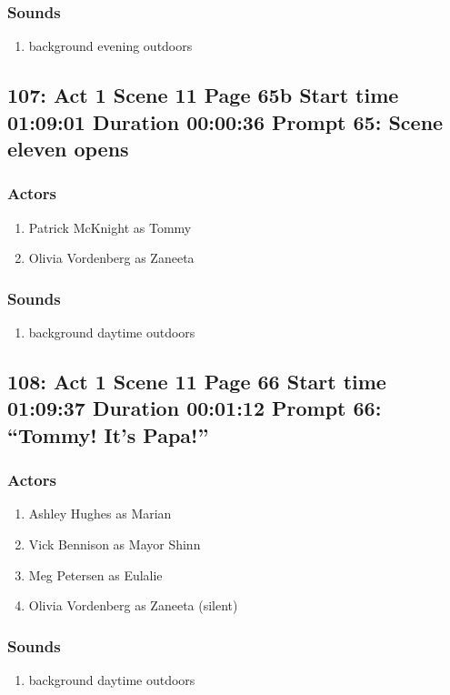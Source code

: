 \subsubsection{Sounds}
\begin{enumerate}
\item background evening outdoors
\end{enumerate}
\subsection{107: Act 1 Scene 11 Page 65b Start time 01:09:01 Duration 00:00:36 Prompt 65: Scene eleven opens}

\subsubsection{Actors}
\begin{enumerate}
\item Patrick McKnight as Tommy
\item Olivia Vordenberg as Zaneeta
\end{enumerate}

\subsubsection{Sounds}
\begin{enumerate}
\item background daytime outdoors
\end{enumerate}
\subsection{108: Act 1 Scene 11 Page 66 Start time 01:09:37 Duration 00:01:12 Prompt 66: ``Tommy!  It's Papa!''}

\subsubsection{Actors}
\begin{enumerate}
\item Ashley Hughes as Marian
\item Vick Bennison as Mayor Shinn
\item Meg Petersen as Eulalie
\item Olivia Vordenberg as Zaneeta (silent)
\end{enumerate}

\subsubsection{Sounds}
\begin{enumerate}
\item background daytime outdoors
\end{enumerate}
